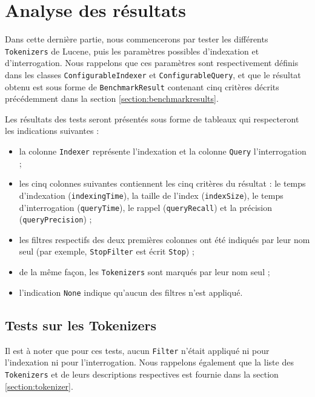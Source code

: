 \section{Analyse des résultats}

Dans cette dernière partie, nous commencerons par tester les différents \texttt{Tokenizers} de Lucene, puis les paramètres possibles d’indexation et d’interrogation. Nous rappelons que ces paramètres sont respectivement définis dans les classes \texttt{ConfigurableIndexer} et \texttt{ConfigurableQuery}, et que le résultat obtenu est sous forme de \texttt{BenchmarkResult} contenant cinq critères décrits précédemment dans la section \ref{section:benchmarkresults}.

Les résultats des tests seront présentés sous forme de tableaux qui respecteront les indications suivantes :
\begin{itemize}
    \item la colonne \texttt{Indexer} représente l’indexation et la colonne \texttt{Query} l’interrogation ;
    \item les cinq colonnes suivantes contiennent les cinq critères du résultat : le temps d’indexation (\texttt{indexingTime}), la taille de l’index (\texttt{indexSize}), le temps d’interrogation (\texttt{queryTime}), le rappel (\texttt{queryRecall}) et la précision (\texttt{queryPrecision}) ;
    \item les filtres respectifs des deux premières colonnes ont été indiqués par leur nom seul (par exemple, \texttt{StopFilter} est écrit \texttt{Stop}) ;
    \item de la même façon, les \texttt{Tokenizers} sont marqués par leur nom seul ;
    \item l’indication \texttt{None} indique qu’aucun des filtres n’est appliqué.
\end{itemize}

\subsection{Tests sur les Tokenizers}

Il est à noter que pour ces tests, aucun \texttt{Filter} n’était appliqué ni pour l’indexation ni pour l’interrogation. Nous rappelons également que la liste des \texttt{Tokenizers} et de leurs descriptions respectives est fournie dans la section \ref{section:tokenizer}.

